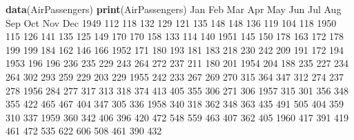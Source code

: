 \documentclass[12pt, krantz2,]{krantz}
\newenvironment{Shaded}{\begin{snugshade}}{\end{snugshade}}
\newcommand{\DecValTok}[1]{\textcolor[rgb]{0.06,0.06,0.06}{#1}}
\newcommand{\KeywordTok}[1]{\textcolor[rgb]{0.27,0.27,0.27}{\textbf{#1}}}
\newcommand{\NormalTok}[1]{#1}
\theoremstyle{definition}
\theoremstyle{definition}
\theoremstyle{definition}
\newcommand{\1}{\mathbbm{1}}
\begin{document}
\begin{Shaded}
\begin{Highlighting}[]
\KeywordTok{data}\NormalTok{(AirPassengers)}
\KeywordTok{print}\NormalTok{(AirPassengers)}
\NormalTok{     Jan Feb Mar Apr May Jun Jul Aug Sep Oct Nov Dec}
\DecValTok{1949} \DecValTok{112} \DecValTok{118} \DecValTok{132} \DecValTok{129} \DecValTok{121} \DecValTok{135} \DecValTok{148} \DecValTok{148} \DecValTok{136} \DecValTok{119} \DecValTok{104} \DecValTok{118}
\DecValTok{1950} \DecValTok{115} \DecValTok{126} \DecValTok{141} \DecValTok{135} \DecValTok{125} \DecValTok{149} \DecValTok{170} \DecValTok{170} \DecValTok{158} \DecValTok{133} \DecValTok{114} \DecValTok{140}
\DecValTok{1951} \DecValTok{145} \DecValTok{150} \DecValTok{178} \DecValTok{163} \DecValTok{172} \DecValTok{178} \DecValTok{199} \DecValTok{199} \DecValTok{184} \DecValTok{162} \DecValTok{146} \DecValTok{166}
\DecValTok{1952} \DecValTok{171} \DecValTok{180} \DecValTok{193} \DecValTok{181} \DecValTok{183} \DecValTok{218} \DecValTok{230} \DecValTok{242} \DecValTok{209} \DecValTok{191} \DecValTok{172} \DecValTok{194}
\DecValTok{1953} \DecValTok{196} \DecValTok{196} \DecValTok{236} \DecValTok{235} \DecValTok{229} \DecValTok{243} \DecValTok{264} \DecValTok{272} \DecValTok{237} \DecValTok{211} \DecValTok{180} \DecValTok{201}
\DecValTok{1954} \DecValTok{204} \DecValTok{188} \DecValTok{235} \DecValTok{227} \DecValTok{234} \DecValTok{264} \DecValTok{302} \DecValTok{293} \DecValTok{259} \DecValTok{229} \DecValTok{203} \DecValTok{229}
\DecValTok{1955} \DecValTok{242} \DecValTok{233} \DecValTok{267} \DecValTok{269} \DecValTok{270} \DecValTok{315} \DecValTok{364} \DecValTok{347} \DecValTok{312} \DecValTok{274} \DecValTok{237} \DecValTok{278}
\DecValTok{1956} \DecValTok{284} \DecValTok{277} \DecValTok{317} \DecValTok{313} \DecValTok{318} \DecValTok{374} \DecValTok{413} \DecValTok{405} \DecValTok{355} \DecValTok{306} \DecValTok{271} \DecValTok{306}
\DecValTok{1957} \DecValTok{315} \DecValTok{301} \DecValTok{356} \DecValTok{348} \DecValTok{355} \DecValTok{422} \DecValTok{465} \DecValTok{467} \DecValTok{404} \DecValTok{347} \DecValTok{305} \DecValTok{336}
\DecValTok{1958} \DecValTok{340} \DecValTok{318} \DecValTok{362} \DecValTok{348} \DecValTok{363} \DecValTok{435} \DecValTok{491} \DecValTok{505} \DecValTok{404} \DecValTok{359} \DecValTok{310} \DecValTok{337}
\DecValTok{1959} \DecValTok{360} \DecValTok{342} \DecValTok{406} \DecValTok{396} \DecValTok{420} \DecValTok{472} \DecValTok{548} \DecValTok{559} \DecValTok{463} \DecValTok{407} \DecValTok{362} \DecValTok{405}
\DecValTok{1960} \DecValTok{417} \DecValTok{391} \DecValTok{419} \DecValTok{461} \DecValTok{472} \DecValTok{535} \DecValTok{622} \DecValTok{606} \DecValTok{508} \DecValTok{461} \DecValTok{390} \DecValTok{432}
\end{Highlighting}
\end{Shaded}
\end{document}
